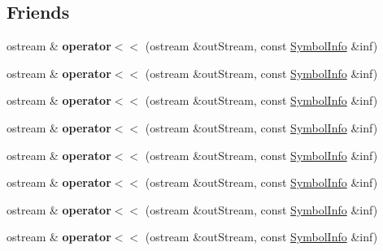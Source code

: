 \subsection*{Friends}
\begin{DoxyCompactItemize}
\item 
\hypertarget{structSymbolInfo_a4fdd5318cd23696f82e8b29daa716504}{ostream \& {\bfseries operator$<$$<$} (ostream \&out\-Stream, const \hyperlink{structSymbolInfo}{Symbol\-Info} \&inf)}\label{structSymbolInfo_a4fdd5318cd23696f82e8b29daa716504}

\item 
\hypertarget{structSymbolInfo_a4fdd5318cd23696f82e8b29daa716504}{ostream \& {\bfseries operator$<$$<$} (ostream \&out\-Stream, const \hyperlink{structSymbolInfo}{Symbol\-Info} \&inf)}\label{structSymbolInfo_a4fdd5318cd23696f82e8b29daa716504}

\item 
\hypertarget{structSymbolInfo_a4fdd5318cd23696f82e8b29daa716504}{ostream \& {\bfseries operator$<$$<$} (ostream \&out\-Stream, const \hyperlink{structSymbolInfo}{Symbol\-Info} \&inf)}\label{structSymbolInfo_a4fdd5318cd23696f82e8b29daa716504}

\item 
\hypertarget{structSymbolInfo_a4fdd5318cd23696f82e8b29daa716504}{ostream \& {\bfseries operator$<$$<$} (ostream \&out\-Stream, const \hyperlink{structSymbolInfo}{Symbol\-Info} \&inf)}\label{structSymbolInfo_a4fdd5318cd23696f82e8b29daa716504}

\item 
\hypertarget{structSymbolInfo_a4fdd5318cd23696f82e8b29daa716504}{ostream \& {\bfseries operator$<$$<$} (ostream \&out\-Stream, const \hyperlink{structSymbolInfo}{Symbol\-Info} \&inf)}\label{structSymbolInfo_a4fdd5318cd23696f82e8b29daa716504}

\item 
\hypertarget{structSymbolInfo_a4fdd5318cd23696f82e8b29daa716504}{ostream \& {\bfseries operator$<$$<$} (ostream \&out\-Stream, const \hyperlink{structSymbolInfo}{Symbol\-Info} \&inf)}\label{structSymbolInfo_a4fdd5318cd23696f82e8b29daa716504}

\item 
\hypertarget{structSymbolInfo_a4fdd5318cd23696f82e8b29daa716504}{ostream \& {\bfseries operator$<$$<$} (ostream \&out\-Stream, const \hyperlink{structSymbolInfo}{Symbol\-Info} \&inf)}\label{structSymbolInfo_a4fdd5318cd23696f82e8b29daa716504}

\item 
\hypertarget{structSymbolInfo_a4fdd5318cd23696f82e8b29daa716504}{ostream \& {\bfseries operator$<$$<$} (ostream \&out\-Stream, const \hyperlink{structSymbolInfo}{Symbol\-Info} \&inf)}\label{structSymbolInfo_a4fdd5318cd23696f82e8b29daa716504}


\end{DoxyCompactItemize}
